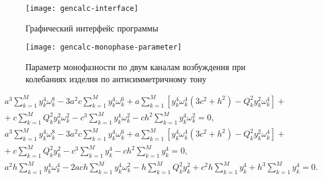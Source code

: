 \begin{figure}[!htb]
	\centerfloat
	\texttt{[image: gencalc-interface]}
	\caption{Графический интерфейс программы} \label{fig:gencalc-interface}
\end{figure}

\begin{figure}[!htb]
	\centerfloat
	\texttt{[image: gencalc-monophase-parameter]}
	\caption{Параметр монофазности по двум каналам возбуждения при колебаниях изделия по антисимметричному тону} \label{fig:gencalc-monophase-parameter}
\end{figure}

\begin{equation}
	\begin{aligned}
		a ^ 3 \sum_{k = 1} ^ M y_k ^ 4 \omega_k ^ 8 - 3 a ^ 2 c \sum_{k = 1} ^ M y_k ^ 4 \omega_k ^ 6 + a \sum_{k = 1} ^ M \left[ y_k ^ 4 \omega_k ^ 4 \left(3 c ^ 2 + h ^ 2 \right) - Q_k ^ 2 y_k ^ 2 \omega_k ^ 4 \right] + \\
		+ \ c \sum_{k = 1} ^ M Q_k ^ 2 y_k ^ 2 \omega_k ^ 2 - c ^ 3 \sum_{k = 1} ^ M y_k ^ 4 \omega_k ^ 2 - c h ^ 2 \sum_{k = 1} ^ M y_k ^ 4 \omega_k ^ 2 = 0, \\
		a ^ 3 \sum_{k = 1} ^ M y_k ^ 4 \omega_k ^ 8 - 3 a ^ 2 c \sum_{k = 1} ^ M y_k ^ 4 \omega_k ^ 6 + a \sum_{k = 1} ^ M \left[ y_k ^ 4 \omega_k ^ 4 \left(3 c ^ 2 + h ^ 2 \right) - Q_k ^ 2 y_k ^ 2 \omega_k ^ 4 \right] + \\
		+ \ c \sum_{k = 1} ^ M Q_k ^ 2 y_k ^ 2 - c ^ 3 \sum_{k = 1} ^ M y_k ^ 4 - c h ^ 2 \sum_{k = 1} ^ M y_k ^ 4 = 0, \\
		a ^ 2 h \sum_{k = 1} ^ M y_k ^ 4 \omega_k ^ 4 - 2 a c h \sum_{k = 1} ^ M y_k ^ 4 \omega_k ^ 2 - h \sum_{k = 1} ^ M Q_k ^ 2 y_k ^ 2 + c ^ 2 h \sum_{k = 1} ^ M y_k ^ 4 + h ^ 3 \sum_{k = 1} ^ M y_k ^ 4 = 0. 
	\end{aligned}
	\label{eq:generalModalSystem}
\end{equation}

